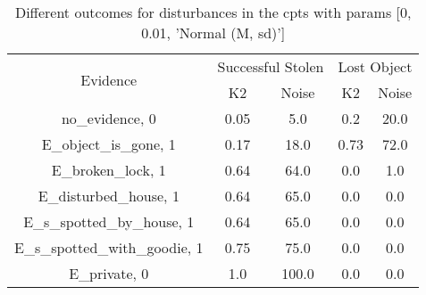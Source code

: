 \begin{table}\begin{tabular}{c|cc|cc}\toprule\multirow{2}{*}{Evidence} & \multicolumn{2}{c}{Successful Stolen} & \multicolumn{2}{c}{Lost Object} \\& {K2} & {Noise} & {K2} & {Noise} \\\midrule
no\_evidence, 0 & 0.05&5.0&0.2&20.0\\E\_object\_is\_gone, 1 & 0.17&18.0&0.73&72.0\\E\_broken\_lock, 1 & 0.64&64.0&0.0&1.0\\E\_disturbed\_house, 1 & 0.64&65.0&0.0&0.0\\E\_s\_spotted\_by\_house, 1 & 0.64&65.0&0.0&0.0\\E\_s\_spotted\_with\_goodie, 1 & 0.75&75.0&0.0&0.0\\E\_private, 0 & 1.0&100.0&0.0&0.0\\\bottomrule\end{tabular}\caption{Different outcomes for disturbances in the cpts with params [0, 0.01, 'Normal (M, sd)']}\end{table}